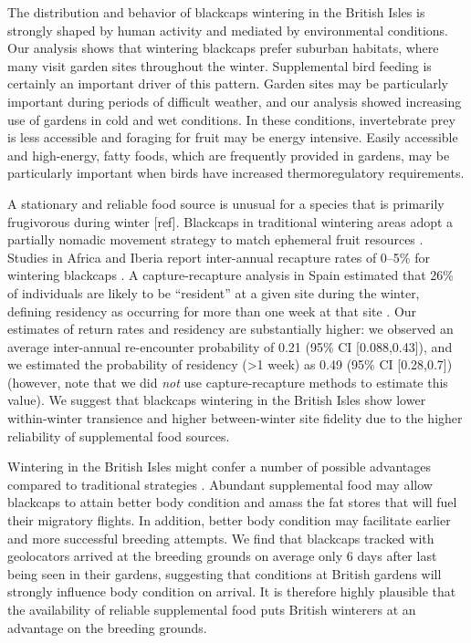 \documentclass[a4paper, twoside]{templates/ociamthesis}
\begin{document}
The distribution and behavior of blackcaps wintering in the British Isles is strongly shaped by human activity and mediated by environmental conditions. Our analysis shows that wintering blackcaps prefer suburban habitats, where many visit garden sites throughout the winter. Supplemental bird feeding is certainly an important driver of this pattern. Garden sites may be particularly important during periods of difficult weather, and our analysis showed increasing use of gardens in cold and wet conditions. In these conditions, invertebrate prey is less accessible and foraging for fruit may be energy intensive. Easily accessible and high-energy, fatty foods, which are frequently provided in gardens, may be particularly important when birds have increased thermoregulatory requirements.

A stationary and reliable food source is unusual for a species that is primarily frugivorous during winter {[}ref{]}. Blackcaps in traditional wintering areas adopt a partially nomadic movement strategy to match ephemeral fruit resources \autocite{beldaResidentTransientDynamics2007,cuadradoYearYearRecurrence1992}. Studies in Africa and Iberia report inter-annual recapture rates of 0--5\% for wintering blackcaps \autocite{cuadradoAllBlackcapsSylvia1995,cuadradoYearYearRecurrence1992,kingSiteFidelityRecurrence2001,loveiMigrationWinteringBlackcap1985}. A capture-recapture analysis in Spain estimated that 26\% of individuals are likely to be ``resident'' at a given site during the winter, defining residency as occurring for more than one week at that site \autocite{beldaResidentTransientDynamics2007}. Our estimates of return rates and residency are substantially higher: we observed an average inter-annual re-encounter probability of 0.21 (95\% CI {[}0.088,0.43{]}), and we estimated the probability of residency (\textgreater1 week) as 0.49 (95\% CI {[}0.28,0.7{]}) (however, note that we did \emph{not} use capture-recapture methods to estimate this value). We suggest that blackcaps wintering in the British Isles show lower within-winter transience and higher between-winter site fidelity due to the higher reliability of supplemental food sources.

Wintering in the British Isles might confer a number of possible advantages compared to traditional strategies \autocite{bertholdMigratoryBehaviourPopulation1988}. Abundant supplemental food may allow blackcaps to attain better body condition and amass the fat stores that will fuel their migratory flights. In addition, better body condition may facilitate earlier and more successful breeding attempts. We find that blackcaps tracked with geolocators arrived at the breeding grounds on average only 6 days after last being seen in their gardens, suggesting that conditions at British gardens will strongly influence body condition on arrival. It is therefore highly plausible that the availability of reliable supplemental food puts British winterers at an advantage on the breeding grounds.
\end{document}

